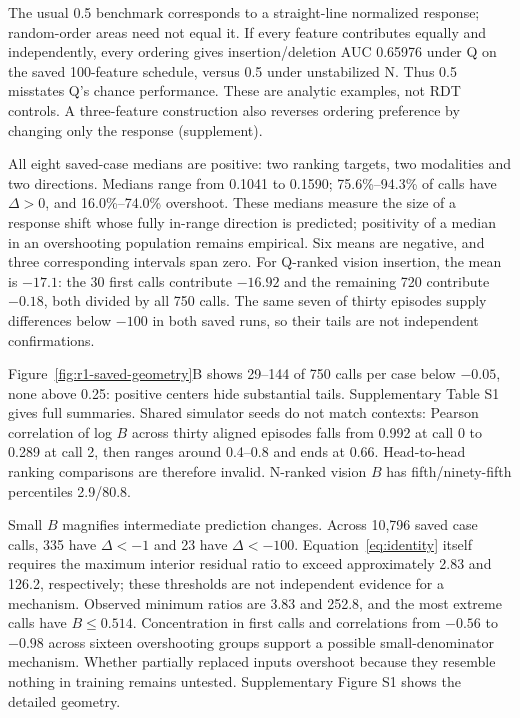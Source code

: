 \documentclass[12pt,letterpaper]{article}
\begin{document}
The usual 0.5 benchmark corresponds to a straight-line normalized response; random-order areas need not equal it. If every feature contributes equally and independently, every ordering gives insertion/deletion AUC 0.65976 under Q on the saved 100-feature schedule, versus 0.5 under unstabilized N. Thus 0.5 misstates Q's chance performance. These are analytic examples, not RDT controls. A three-feature construction also reverses ordering preference by changing only the response (supplement).

All eight saved-case medians are positive: two ranking targets, two modalities and two directions. Medians range from 0.1041 to 0.1590; 75.6\%--94.3\% of calls have $\Delta>0$, and 16.0\%--74.0\% overshoot. These medians measure the size of a response shift whose fully in-range direction is predicted; positivity of a median in an overshooting population remains empirical. Six means are negative, and three corresponding intervals span zero. For Q-ranked vision insertion, the mean is $-17.1$: the 30 first calls contribute $-16.92$ and the remaining 720 contribute $-0.18$, both divided by all 750 calls. The same seven of thirty episodes supply differences below $-100$ in both saved runs, so their tails are not independent confirmations.

Figure~\ref{fig:r1-saved-geometry}B shows 29--144 of 750 calls per case below $-0.05$, none above 0.25: positive centers hide substantial tails. Supplementary Table S1 gives full summaries. Shared simulator seeds do not match contexts: Pearson correlation of log $B$ across thirty aligned episodes falls from 0.992 at call 0 to 0.289 at call 2, then ranges around 0.4--0.8 and ends at 0.66. Head-to-head ranking comparisons are therefore invalid. N-ranked vision $B$ has fifth/ninety-fifth percentiles 2.9/80.8.

Small $B$ magnifies intermediate prediction changes. Across 10,796 saved case calls, 335 have $\Delta<-1$ and 23 have $\Delta<-100$. Equation~\ref{eq:identity} itself requires the maximum interior residual ratio to exceed approximately 2.83 and 126.2, respectively; these thresholds are not independent evidence for a mechanism. Observed minimum ratios are 3.83 and 252.8, and the most extreme calls have $B\le0.514$. Concentration in first calls and correlations from $-0.56$ to $-0.98$ across sixteen overshooting groups support a possible small-denominator mechanism. Whether partially replaced inputs overshoot because they resemble nothing in training remains untested. Supplementary Figure S1 shows the detailed geometry.
\end{document}
